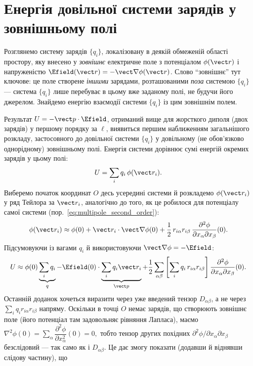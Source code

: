 \section{Енергія довільної системи зарядів у зовнішньому полі\ExtraMark}\label{sec:QuadEnergy}\hypertarget{energy-in-external-field}{}
\begin{Extra}

Розглянемо систему зарядів $\{q_i\}$, локалізовану в деякій обмеженій області простору, яку внесено у \emph{зовнішнє} електричне поле з потенціалом
$\phi(\vect r)$ і напруженістю $\Efield(\vect r) = -\vect\nabla\phi(\vect r)$. Слово \enquote{зовнішнє} тут ключове: це поле створене \emph{іншими} зарядами,
розташованими \emph{поза} системою $\{q_i\}$ --- система $\{q_i\}$ лише перебуває в цьому вже заданому полі, не будучи його джерелом. Знайдемо
енергію взаємодії системи $\{q_i\}$ із цим зовнішнім полем.

Результат $U=-\vect p\cdot\Efield$, отриманий вище для жорсткого диполя (двох зарядів) у першому порядку за $\ell$, виявиться першим наближенням
загальнішого розкладу, застосовного до довільної системи $\{q_i\}$ у довільному (не обов'язково однорідному) зовнішньому полі. Енергія системи
дорівнює сумі енергій окремих зарядів у цьому полі:
\begin{equation*}
	U = \sum_i q_i\, \phi(\vect r_i).
\end{equation*}
Виберемо початок координат $O$ десь усередині системи й розкладемо $\phi(\vect r_i)$ у ряд Тейлора за $\vect r_i$, аналогічно до того, як це робилося
для потенціалу самої системи (пор.~\eqref{eq:multipole_second_order}):
\begin{equation*}
	\phi(\vect r_i) \approx \phi(0) + \vect r_i\cdot\vect\nabla\phi(0) +
	\frac12\, r_{i\alpha}r_{i\beta}\, \frac{\partial^2\phi}{\partial x_\alpha\partial x_\beta}(0).
\end{equation*}
Підсумовуючи із вагами $q_i$ й використовуючи $\vect\nabla\phi = -\Efield$:
\begin{equation*}
	U \approx \phi(0)\underbrace{\sum_i q_i}_{q} - \Efield(0)\cdot\underbrace{\sum_i q_i\vect r_i}_{\vect p} +
	\frac12\sum_{\alpha\beta}\left[\sum_i q_i\, r_{i\alpha}r_{i\beta}\right]\frac{\partial^2\phi}{\partial x_\alpha\partial x_\beta}(0).
\end{equation*}
Останній доданок хочеться виразити через уже введений тензор $D_{\alpha\beta}$, а не через $\sum_i q_i r_{i\alpha}r_{i\beta}$ напряму. Оскільки в точці
$O$ немає зарядів, що створюють зовнішнє поле (його потенціал там задовольняє рівняння Лапласа), маємо
$
	\nabla^2\phi(0) = \sum_\alpha \dfrac{\partial^2\phi}{\partial x_\alpha^2}(0) = 0,
$
тобто тензор других похідних $\partial^2\phi/\partial x_\alpha\partial x_\beta$ безслідовий --- так само як і $D_{\alpha\beta}$. Це дає змогу
показати (додавши й віднявши слідову частину), що


\end{Extra}
